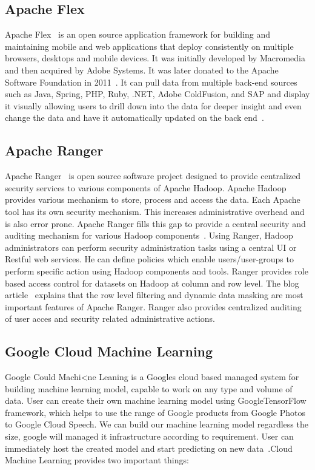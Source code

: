 \subsection{Apache Flex \cv}

Apache Flex~\cite{www-flex} is an open source application framework
for building and maintaining mobile and web applications that deploy
consistently on multiple browsers, desktops and mobile devices. It was
initially developed by Macromedia and then acquired by Adobe
Systems. It was later donated to the Apache Software Foundation in
2011~\cite{blog-flex}. It can pull data from multiple back-end sources
such as Java, Spring, PHP, Ruby, .NET, Adobe ColdFusion, and SAP and
display it visually allowing users to drill down into the data for
deeper insight and even change the data and have it automatically
updated on the back end~\cite{wiki-flex}.

\subsection{Apache Ranger \cv}

Apache Ranger~\cite{www-apache-ranger} is open source software project
designed to provide centralized security services to various
components of Apache Hadoop. Apache Hadoop provides various mechanism
to store, process and access the data. Each Apache tool has its own
security mechanism. This increases administrative overhead and is also
error prone.  Apache Ranger fills this gap to provide a central
security and auditing mechanism for various Hadoop
components~\cite{www-ranger-architecture}. Using Ranger, Hadoop
administrators can perform security administration tasks using a
central UI or Restful web services. He can define policies which
enable users/user-groups to perform specific action using Hadoop
components and tools. Ranger provides role based access control for
datasets on Hadoop at column and row level.  The blog
article~\cite{www-ranger-key-features} explains that the row level
filtering and dynamic data masking are most important features of
Apache Ranger. Ranger also provides centralized auditing of user acces
and security related administrative actions.
     
\subsection{Google Cloud Machine Learning}
     
Google Could Machi<ne Leaning is a Googles cloud based managed system
for building machine learning model, capable to work on any type and
volume of data. User can create their own machine learning model using
GoogleTensorFlow framework, which helps to use the range of Google
products from Google Photos to Google Cloud Speech.  We can build our
machine learning model regardless the size, google will managed it
infrastructure according to requirement. User can immediately host the
created model and start predicting on new
data~\cite{www-googlecloudmachinelearning}.Cloud Machine Learning
provides two important things:
     
